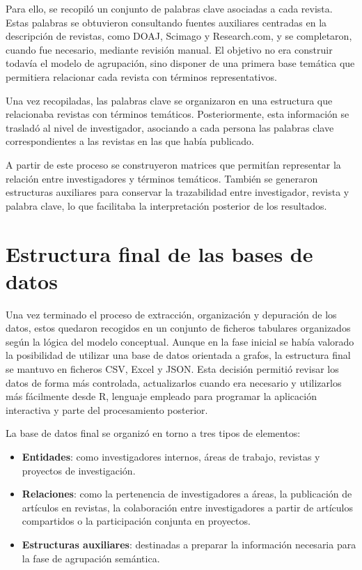 \documentclass[11pt,spanish,listoffigures,listoftables]{tfgetsinf}
\begin{document}
Para ello, se recopiló un conjunto de palabras clave asociadas a cada revista. Estas palabras se obtuvieron consultando fuentes auxiliares centradas en la descripción de revistas, como DOAJ, Scimago y Research.com, y se completaron, cuando fue necesario, mediante revisión manual. El objetivo no era construir todavía el modelo de agrupación, sino disponer de una primera base temática que permitiera relacionar cada revista con términos representativos.

Una vez recopiladas, las palabras clave se organizaron en una estructura que relacionaba revistas con términos temáticos. Posteriormente, esta información se trasladó al nivel de investigador, asociando a cada persona las palabras clave correspondientes a las revistas en las que había publicado.

A partir de este proceso se construyeron matrices que permitían representar la relación entre investigadores y términos temáticos. También se generaron estructuras auxiliares para conservar la trazabilidad entre investigador, revista y palabra clave, lo que facilitaba la interpretación posterior de los resultados.

\section{Estructura final de las bases de datos}

Una vez terminado el proceso de extracción, organización y depuración de los datos, estos quedaron recogidos en un conjunto de ficheros tabulares organizados según la lógica del modelo conceptual. Aunque en la fase inicial se había valorado la posibilidad de utilizar una base de datos orientada a grafos, la estructura final se mantuvo en ficheros CSV, Excel y JSON. Esta decisión permitió revisar los datos de forma más controlada, actualizarlos cuando era necesario y utilizarlos más fácilmente desde R, lenguaje empleado para programar la aplicación interactiva y parte del procesamiento posterior.

La base de datos final se organizó en torno a tres tipos de elementos:

\begin{itemize}
    \item \textbf{Entidades}: como investigadores internos, áreas de trabajo, revistas y proyectos de investigación.
    
    \item \textbf{Relaciones}: como la pertenencia de investigadores a áreas, la publicación de artículos en revistas, la colaboración entre investigadores a partir de artículos compartidos o la participación conjunta en proyectos.

    \item \textbf{Estructuras auxiliares}: destinadas a preparar la información necesaria para la fase de agrupación semántica.
\end{itemize}
\end{document}
